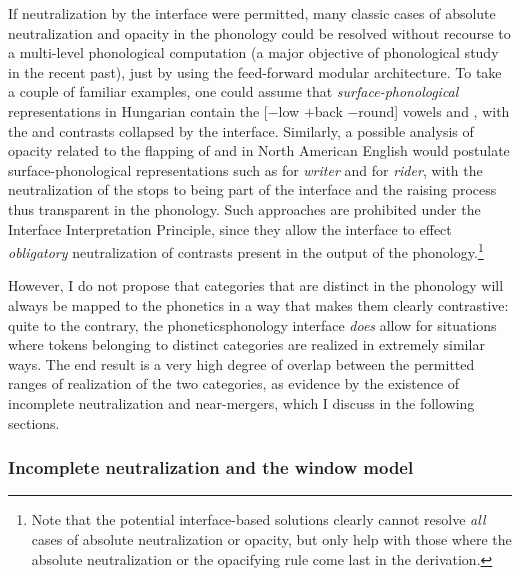 If neutralization by the interface were permitted, many classic cases of absolute neutralization and opacity in the phonology could be resolved without recourse to a multi\hyp level phonological computation (a major objective of phonological study in the recent past), just by using the feed\hyp forward modular architecture. To take a couple of familiar examples, one could assume that \emph{surface\hyp phonological} representations in Hungarian contain the [$-$low $+$back $-$round] vowels \ipa{[ɯ(ː)]} and \ipa{[ɤ(ː)]}, with the \alternation{[ɯ]}{[i]} and \alternation{[ɤ]}{[e]} contrasts collapsed by the interface. Similarly, a possible analysis of opacity related to the flapping of \ipa{[d]} and \ipa{[t]} in North American English would postulate surface\hyp phonological representations such as \ipa{[ɹəɪtɚ]} for \emph{writer} and \ipa{[ɹaɪdɚ]} for \emph{rider}, with the neutralization of the stops to \ipa{[ɾ]} being part of the interface and the raising process thus transparent in the phonology. Such approaches are prohibited under the Interface Interpretation Principle, since they allow the interface to effect \emph{obligatory} neutralization of contrasts present in the output of the phonology.\footnote{Note that the potential interface\hyp based solutions clearly cannot resolve \emph{all} cases of absolute neutralization or opacity, but only help with those where the absolute neutralization or the opacifying rule come last in the derivation.}

However, I do not propose that categories that are distinct in the phonology will always be mapped to the phonetics in a way that makes them clearly contrastive: quite to the contrary, the phonetics\endash phonology interface \emph{does} allow for situations where tokens belonging to distinct categories are realized in extremely similar ways. The end result is a very high degree of overlap between the permitted ranges of realization of the two categories, as evidence by the existence of incomplete neutralization and near\hyp mergers, which I discuss in the following sections.

\subsubsection{Incomplete neutralization and the window model}
\label{sec:incompl-neutr}

